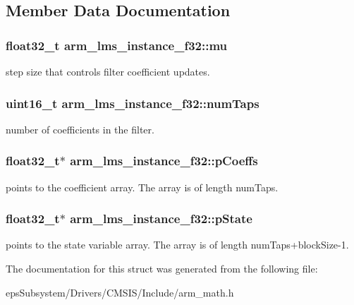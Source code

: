 \subsection{Member Data Documentation}
\hypertarget{structarm__lms__instance__f32_ae2af43d74c93dba16b876e10c97a5b99}{
\subsubsection[{mu}]{\setlength{\rightskip}{0pt plus 5cm}float32\-\_\-t arm\-\_\-lms\-\_\-instance\-\_\-f32\-::mu}}\label{structarm__lms__instance__f32_ae2af43d74c93dba16b876e10c97a5b99}
step size that controls filter coefficient updates. \hypertarget{structarm__lms__instance__f32_af73880d9009982f5d14529869494ec3d}{
\subsubsection[{num\-Taps}]{\setlength{\rightskip}{0pt plus 5cm}uint16\-\_\-t arm\-\_\-lms\-\_\-instance\-\_\-f32\-::num\-Taps}}\label{structarm__lms__instance__f32_af73880d9009982f5d14529869494ec3d}
number of coefficients in the filter. \hypertarget{structarm__lms__instance__f32_a4795c6f7d3f17cec15c2fd09f66edd1a}{
\subsubsection[{p\-Coeffs}]{\setlength{\rightskip}{0pt plus 5cm}float32\-\_\-t$\ast$ arm\-\_\-lms\-\_\-instance\-\_\-f32\-::p\-Coeffs}}\label{structarm__lms__instance__f32_a4795c6f7d3f17cec15c2fd09f66edd1a}
points to the coefficient array. The array is of length num\-Taps. \hypertarget{structarm__lms__instance__f32_aaf94285be2f99b5b9af40bea8dcb14b9}{
\subsubsection[{p\-State}]{\setlength{\rightskip}{0pt plus 5cm}float32\-\_\-t$\ast$ arm\-\_\-lms\-\_\-instance\-\_\-f32\-::p\-State}}\label{structarm__lms__instance__f32_aaf94285be2f99b5b9af40bea8dcb14b9}
points to the state variable array. The array is of length num\-Taps+block\-Size-\/1. 

The documentation for this struct was generated from the following file\-:\begin{DoxyCompactItemize}
\item 
eps\-Subsystem/\-Drivers/\-C\-M\-S\-I\-S/\-Include/arm\-\_\-math.\-h\end{DoxyCompactItemize}
